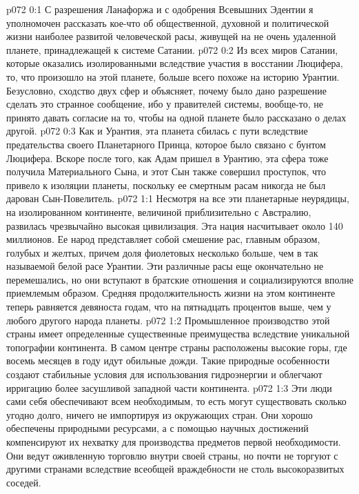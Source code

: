 \author{Мелхиседек}
\vs p072 0:1 С разрешения Ланафоржа и с одобрения Всевышних Эдентии я уполномочен рассказать кое\hyp{}что об общественной, духовной и политической жизни наиболее развитой человеческой расы, живущей на не очень удаленной планете, принадлежащей к системе Сатании.
\vs p072 0:2 Из всех миров Сатании, которые оказались изолированными вследствие участия в восстании Люцифера, то, что произошло на этой планете, больше всего похоже на историю Урантии. Безусловно, сходство двух сфер и объясняет, почему было дано разрешение сделать это странное сообщение, ибо у правителей системы, вообще\hyp{}то, не принято давать согласие на то, чтобы на одной планете было рассказано о делах другой.
\vs p072 0:3 Как и Урантия, эта планета сбилась с пути вследствие предательства своего Планетарного Принца, которое было связано с бунтом Люцифера. Вскоре после того, как Адам пришел в Урантию, эта сфера тоже получила Материального Сына, и этот Сын также совершил проступок, что привело к изоляции планеты, поскольку ее смертным расам никогда не был дарован Сын\hyp{}Повелитель.
\vs p072 1:1 Несмотря на все эти планетарные неурядицы, на изолированном континенте, величиной приблизительно с Австралию, развилась чрезвычайно высокая цивилизация. Эта нация насчитывает около 140 миллионов. Ее народ представляет собой смешение рас, главным образом, голубых и желтых, причем доля фиолетовых несколько больше, чем в так называемой белой расе Урантии. Эти различные расы еще окончательно не перемешались, но они вступают в братские отношения и социализируются вполне приемлемым образом. Средняя продолжительность жизни на этом континенте теперь равняется девяноста годам, что на пятнадцать процентов выше, чем у любого другого народа планеты.
\vs p072 1:2 Промышленное производство этой страны имеет определенные существенные преимущества вследствие уникальной топографии континента. В самом центре страны расположены высокие горы, где восемь месяцев в году идут обильные дожди. Такие природные особенности создают стабильные условия для использования гидроэнергии и облегчают ирригацию более засушливой западной части континента.
\vs p072 1:3 Эти люди сами себя обеспечивают всем необходимым, то есть могут существовать сколько угодно долго, ничего не импортируя из окружающих стран. Они хорошо обеспечены природными ресурсами, а с помощью научных достижений компенсируют их нехватку для производства предметов первой необходимости. Они ведут оживленную торговлю внутри своей страны, но почти не торгуют с другими странами вследствие всеобщей враждебности не столь высокоразвитых соседей.
